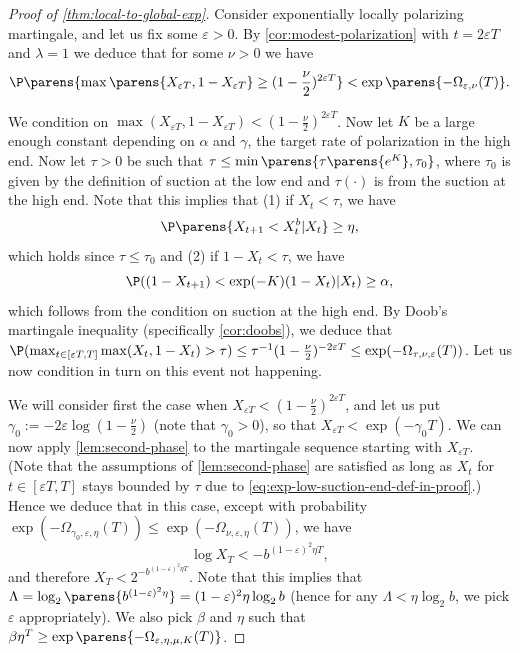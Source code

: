 \documentclass[11pt]{article}
\begin{document}
\begin{proof}[Proof of \cref{thm:local-to-global-exp}]
	Consider exponentially locally polarizing martingale, and let us fix some $\varepsilon > 0$. By \cref{cor:modest-polarization} with $t = 2 \varepsilon T$ and $\lambda = 1$ we deduce that for some $\nu>0$ we have
	\begin{equation*}
		\P\parens{\max\parens{X_{\varepsilon T}, 1 - X_{\varepsilon T}} \geq (1 - \frac{\nu}{2})^{2\varepsilon T}} < \exp\parens{-\Omega_{\varepsilon,\nu}(T)}.
	\end{equation*}
	
	We condition on $\max(X_{\varepsilon T}, 1 - X_{\varepsilon T}) < (1 - \frac{\nu}{2})^{2\varepsilon T}$. 
	Now let $K$ be a large enough constant depending on $\alpha$ and $\gamma$, the target rate of polarization in the high end.
	Now let 
	$\tau>0$  be such that $\tau\le \min\parens{\tau\parens{e^K},\tau_0}$, where $\tau_0$ is given by the definition of suction at the low end and $\tau(\cdot)$ is from the suction at the high end. Note that this implies that (1)  if $X_t < \tau$, we have 
	\begin{equation}
		\label{eq:exp-low-suction-end-def-in-proof}
		\P\parens{X_{t+1} < X_t^b|X_t} \geq \eta,
	\end{equation} 
	which holds since $\tau \leq \tau_0$ and (2) if $1 - X_t < \tau$, we have  \begin{equation}
		\label{eq:high-suction-end-def-in-proof}
		\P((1 - X_{t+1}) < \exp(-K) (1 - X_t)|X_t) \geq \alpha,
	\end{equation} 
	which follows from the condition on suction at the high end.
	By Doob's martingale inequality (specifically \cref{cor:doobs}), we deduce that $\P(\max_{t \in [\varepsilon T, T]} \max(X_{t}, 1 - X_t) > \tau) \leq \tau^{-1} (1 - \frac{\nu}{2})^{-2\varepsilon T} \leq \exp(-\Omega_{\tau,\nu,\varepsilon}(T))$. Let us now condition in turn on this event not happening.
	
	We will consider first the case when $X_{\varepsilon T} < (1 - \frac{\nu}{2})^{2\varepsilon T}$, and let us put $\gamma_0 := - 2 \varepsilon \log (1 - \frac{\nu}{2})$ (note that $\gamma_0>0$), so that $X_{\varepsilon T} < \exp(- \gamma_0 T)$.
	We can now apply \cref{lem:second-phase} to the martingale sequence starting with $X_{\varepsilon T}$. (Note that the assumptions of \cref{lem:second-phase}  are satisfied as long as $X_t$ for $t\in [\varepsilon T,T]$ stays bounded by $\tau$ due to \cref{eq:exp-low-suction-end-def-in-proof}.)
	Hence we deduce that in this case, except with probability $\exp(-\Omega_{\gamma_0, \varepsilon,\eta}(T))\le \exp(-\Omega_{\nu, \varepsilon,\eta}(T))$, we have
	\begin{equation*}
		\log X_{T} < -b^{(1-\varepsilon)^2 \eta T},
	\end{equation*}
	and therefore $X_T < 2^{-b^{(1-\varepsilon)^2 \eta T}}$. Note that this implies that $\Lambda=\log_2\parens{b^{(1-\varepsilon)^2 \eta}}=(1-\varepsilon)^2 \eta\log_2{b}$ (hence for any $\Lambda< \eta\log_2{b}$, we pick $\varepsilon$ appropriately). We also pick $\beta$ and $\eta$ such that $\beta\eta^T\ge \exp\parens{-\Omega_{\varepsilon,\eta,\mu,K}(T)}$.
	

\end{proof}
\end{document}
